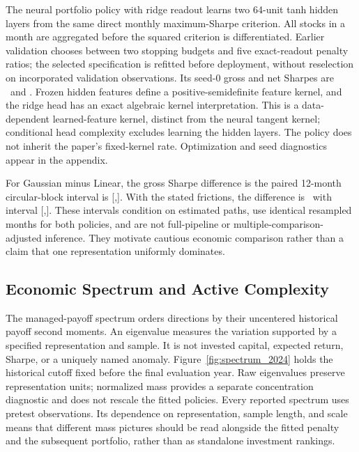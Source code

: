 The neural portfolio policy with ridge readout learns two 64-unit tanh hidden
layers from the same direct monthly maximum-Sharpe criterion. All stocks in
a month are aggregated before the squared criterion is differentiated.
Earlier validation chooses between two stopping budgets and five exact-readout
penalty ratios; the selected specification is refitted before deployment,
without reselection on incorporated validation observations. Its seed-0
gross and net Sharpes are \NeuralGross\ and \NeuralNet. Frozen hidden features
define a positive-semidefinite feature kernel, and the ridge head has an exact
algebraic kernel interpretation. This is a data-dependent learned-feature
kernel, distinct from the neural tangent kernel; conditional head complexity
excludes learning the hidden layers. The policy does not inherit the paper's
fixed-kernel rate. Optimization and seed diagnostics appear in the appendix.

For Gaussian minus Linear, the gross Sharpe difference is \KernelGrossDelta\;
the paired 12-month circular-block interval is [\KernelGrossLow,\KernelGrossHigh].
With the stated frictions, the difference is \KernelNetDelta\, with interval
[\KernelNetLow,\KernelNetHigh]. These intervals condition on estimated paths,
use identical resampled months for both policies, and are not full-pipeline or
multiple-comparison-adjusted inference. They motivate cautious economic
comparison rather than a claim that one representation uniformly dominates.

\subsection{Economic Spectrum and Active Complexity}

The managed-payoff spectrum orders directions by their uncentered historical
payoff second moments. An eigenvalue measures the variation supported by a
specified representation and sample. It is not invested capital, expected
return, Sharpe, or a uniquely named anomaly. Figure~\ref{fig:spectrum_2024}
holds the historical cutoff fixed before the final evaluation year. Raw
eigenvalues preserve representation units; normalized mass provides a
separate concentration diagnostic and does not rescale the fitted policies.
Every reported spectrum uses pretest observations. Its dependence on
representation, sample length, and scale means that different mass pictures
should be read alongside the fitted penalty and the subsequent portfolio,
rather than as standalone investment rankings.

